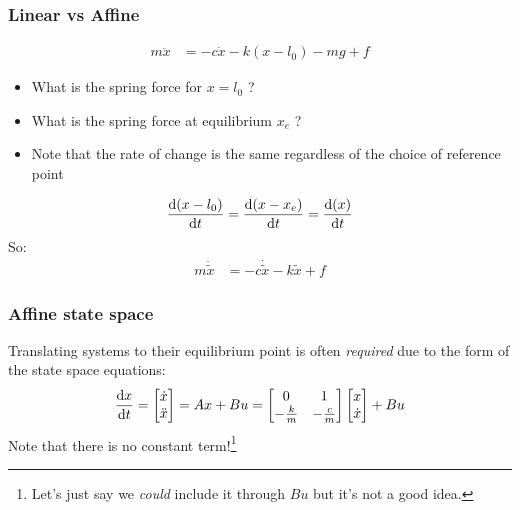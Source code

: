 \documentclass[10pt]{beamer-control}
\begin{document}
\begin{frame}
\frametitle{Linear vs Affine}

\begin{align}
m\ddot x &= -c\dot x - k (x-l_0) - mg + f
\end{align}
\begin{itemize}
\item What is the spring force for $x = l_0$ ?
\item What is the spring force at equilibrium $x_e$ ?
\item Note that the rate of change is the same regardless of the choice of reference point
\end{itemize}
\begin{align}
\frac{\mathrm{d} (x-l_0)}{\mathrm{d} t} =
\frac{\mathrm{d} (x-x_e)}{\mathrm{d} t} =
\frac{\mathrm{d} (x)}{\mathrm{d} t}
\end{align}
So:
\begin{align}
m\ddot {\tilde{x}} &= -c\dot{\tilde x} - k \tilde{x} + f
\end{align}

\end{frame}

\begin{frame}
\frametitle{Affine state space}
Translating systems to their equilibrium point is often \emph{required} due to the form of the state space equations:
\begin{align}
\frac{\mathrm{d} x}{\mathrm{d} t} = \begin{bmatrix}\dot x\\\ddot x\end{bmatrix} = Ax + Bu = \begin{bmatrix}0 & 1\\ -\frac km & -\frac cm \end{bmatrix} \begin{bmatrix}x \\ \dot x\end{bmatrix} + Bu
\end{align}
Note that there is no constant term!\footnote{Let's just say we \emph{could} include it through  $Bu$  but it's not a good idea.}
\end{frame}
\end{document}

